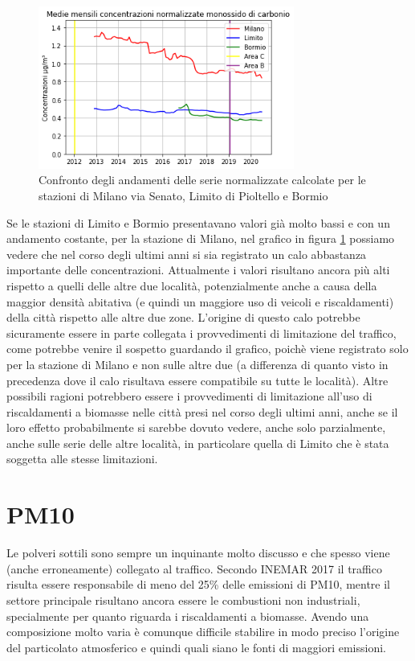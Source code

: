 \documentclass[a4paper,12pt]{report}
\begin{document}
\begin{figure}[h]
\centering
\includegraphics[width=0.75\textwidth]{co_traffico}
\caption{Confronto degli andamenti delle serie normalizzate calcolate per le stazioni di Milano via Senato, Limito di Pioltello e Bormio}
\label{fig:co_traffico}
\end{figure}

Se le stazioni di Limito e Bormio presentavano valori già molto bassi e con un andamento costante, per la stazione di Milano, nel grafico in figura \ref{fig:co_traffico} possiamo vedere che nel corso degli ultimi anni si sia registrato un calo abbastanza importante delle concentrazioni. Attualmente i valori risultano ancora più alti rispetto a quelli delle altre due località, potenzialmente anche a causa della maggior densità abitativa (e quindi un maggiore uso di veicoli e riscaldamenti) della città rispetto alle altre due zone.
L'origine di questo calo potrebbe sicuramente essere in parte collegata i provvedimenti di limitazione del traffico, come potrebbe venire il sospetto guardando il grafico, poichè viene registrato solo per la stazione di Milano e non sulle altre due (a differenza di quanto visto in precedenza dove il calo risultava essere compatibile su tutte le località). Altre possibili ragioni potrebbero essere i provvedimenti di limitazione all'uso di riscaldamenti a biomasse nelle città presi nel corso degli ultimi anni, anche se il loro effetto probabilmente si sarebbe dovuto vedere, anche solo parzialmente, anche sulle serie delle altre località, in particolare quella di Limito che è stata soggetta alle stesse limitazioni.

\section{PM10}
Le polveri sottili sono sempre un inquinante molto discusso e che spesso viene (anche erroneamente) collegato al traffico. Secondo INEMAR 2017 \cite{inemar2017} il traffico risulta essere responsabile di meno del 25\% delle emissioni di PM10, mentre il settore principale risultano ancora essere le combustioni non industriali, specialmente per quanto riguarda i riscaldamenti a biomasse. Avendo una composizione molto varia è comunque difficile stabilire in modo preciso l'origine del particolato atmosferico e quindi quali siano le fonti di maggiori emissioni.
\end{document}
